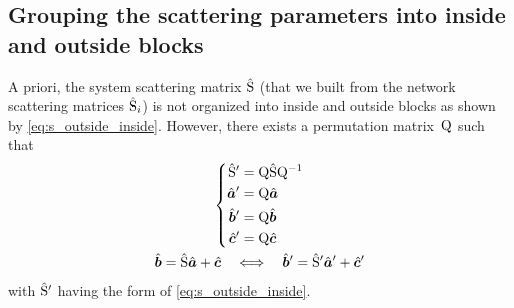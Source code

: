 \subsection{Grouping the scattering parameters into inside and outside blocks}
A priori, the system scattering matrix $\hat{\mathrm{S}}$ (that we built from the network scattering matrices $\hat{\mathrm{S}}_i$) is not organized into inside and outside blocks as shown by \cref{eq:s_outside_inside}.
However, there exists a permutation matrix~$\mathrm{Q}$ such that
\begin{gather}
    \left\lbrace
    \begin{aligned}
        \matrcp{S}' &= \matr{Q} \matrcp{S} \matr{Q}^{-1} \\
        \vectcp{a}' &= \matr{Q} \vectcp{a} \\
        \vectcp{b}' &= \matr{Q} \vectcp{b} \\
        \vectcp{c}' &= \matr{Q} \vectcp{c}
    \end{aligned}
    \right.
    \label{eq:permute_s}
    \\
    \vectcp{b} = \matrcp{S} \vectcp{a} + \vectcp{c}
    \quad \Longleftrightarrow \quad
    \vectcp{b}' = \matrcp{S}' \vectcp{a}' + \vectcp{c}'
    \label{eq:permute_s_equiv}
\end{gather}
with $\hat{\mathrm{S}}'$ having the form of \cref{eq:s_outside_inside}.

